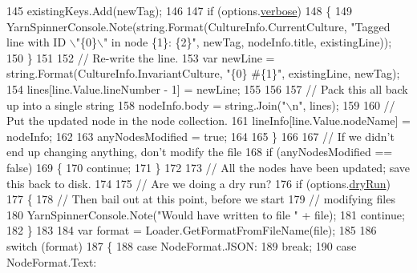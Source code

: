 \begin{DoxyCode}
145                     existingKeys.Add(newTag);
146 
147                     \textcolor{keywordflow}{if} (options.\hyperlink{a00041_ada4d83d1756918f362d55f6649b82b17}{verbose})
148                     \{
149                         YarnSpinnerConsole.Note(string.Format(CultureInfo.CurrentCulture, \textcolor{stringliteral}{"Tagged line with
       ID \(\backslash\)"\{0\}\(\backslash\)" in node \{1\}: \{2\}"}, newTag, nodeInfo.title, existingLine));
150                     \}
151 
152                     \textcolor{comment}{// Re-write the line.}
153                     var newLine = string.Format(CultureInfo.InvariantCulture, \textcolor{stringliteral}{"\{0\} #\{1\}"}, existingLine, 
      newTag);
154                     lines[line.Value.lineNumber - 1] = newLine;
155 
156 
157                     \textcolor{comment}{// Pack this all back up into a single string}
158                     nodeInfo.body = string.Join(\textcolor{stringliteral}{"\(\backslash\)n"}, lines);
159 
160                     \textcolor{comment}{// Put the updated node in the node collection.}
161                     lineInfo[line.Value.nodeName] = nodeInfo;
162 
163                     anyNodesModified = \textcolor{keyword}{true};
164 
165                 \}
166 
167                 \textcolor{comment}{// If we didn't end up changing anything, don't modify the file}
168                 \textcolor{keywordflow}{if} (anyNodesModified == \textcolor{keyword}{false})
169                 \{
170                     \textcolor{keywordflow}{continue};
171                 \}
172 
173                 \textcolor{comment}{// All the nodes have been updated; save this back to disk.}
174 
175                 \textcolor{comment}{// Are we doing a dry run?}
176                 \textcolor{keywordflow}{if} (options.\hyperlink{a00037_a5dc9d9db767738237e988f95fc0330f4}{dryRun})
177                 \{
178                     \textcolor{comment}{// Then bail out at this point, before we start}
179                     \textcolor{comment}{// modifying files}
180                     YarnSpinnerConsole.Note(\textcolor{stringliteral}{"Would have written to file "} + file);
181                     \textcolor{keywordflow}{continue};
182                 \}
183 
184                 var format = Loader.GetFormatFromFileName(file);
185 
186                 \textcolor{keywordflow}{switch} (format)
187                 \{
188                     \textcolor{keywordflow}{case} NodeFormat.JSON:
189                         \textcolor{keywordflow}{break};
190                     \textcolor{keywordflow}{case} NodeFormat.Text:

\end{DoxyCode}
